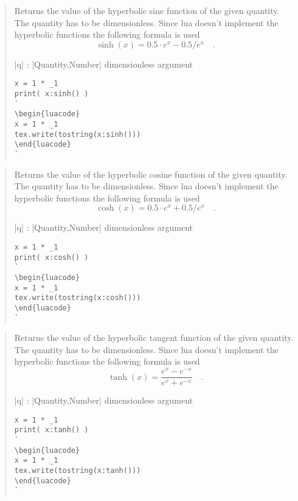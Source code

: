 \documentclass{ltxdoc}
\begin{document}
\begin{quote}
  Returns the value of the hyperbolic sine function of the given quantity. The quantity has to be dimensionless. Since lua doesn't implement the hyperbolic functions the following formula is used 
  $$
    \sinh(x) = 0.5 \cdot e^x - 0.5 / e^x  \quad.
  $$

  \begin{description}
  \item |q| : |Quantity,Number| dimensionless argument
  \end{description}

\begin{lstlisting}
x = 1 * _1
print( x:sinh() )
`
\begin{luacode}
x = 1 * _1
tex.write(tostring(x:sinh()))
\end{luacode}
`
\end{lstlisting}

\end{quote}



\begin{quote}
  Returns the value of the hyperbolic cosine function of the given quantity. The quantity has to be dimensionless. Since lua doesn't implement the hyperbolic functions the following formula is used 
  $$
    \cosh(x) = 0.5 \cdot e^x + 0.5 / e^x  \quad.
  $$

  \begin{description}
  \item |q| : |Quantity,Number| dimensionless argument
  \end{description}

\begin{lstlisting}
x = 1 * _1
print( x:cosh() )
`
\begin{luacode}
x = 1 * _1
tex.write(tostring(x:cosh()))
\end{luacode}
`
\end{lstlisting}

\end{quote}



\begin{quote}
  Returns the value of the hyperbolic tangent function of the given quantity. The quantity has to be dimensionless. Since lua doesn't implement the hyperbolic functions the following formula is used 
  $$
    \tanh(x) = \frac{e^x - e^{-x}}{e^x + e^{-x}} \quad.
  $$


  \begin{description}
  \item |q| : |Quantity,Number| dimensionless argument
  \end{description}

\begin{lstlisting}
x = 1 * _1
print( x:tanh() )
`
\begin{luacode}
x = 1 * _1
tex.write(tostring(x:tanh()))
\end{luacode}
`
\end{lstlisting}

\end{quote}
\end{document}
